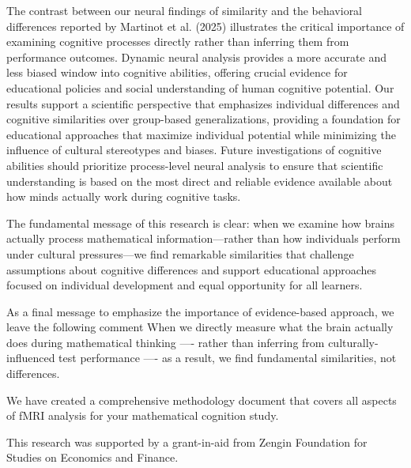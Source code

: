 \documentclass[pdflatex,reference]{sn-jnl}%
\theoremstyle{thmstyleone}%
\theoremstyle{thmstyletwo}%
\theoremstyle{thmstylethree}%
\begin{document}
The contrast between our neural findings of similarity and the behavioral differences reported by Martinot et al. (2025) illustrates the critical importance of examining cognitive processes directly rather than inferring them from performance outcomes. Dynamic neural analysis provides a more accurate and less biased window into cognitive abilities, offering crucial evidence for educational policies and social understanding of human cognitive potential.
Our results support a scientific perspective that emphasizes individual differences and cognitive similarities over group-based generalizations, providing a foundation for educational approaches that maximize individual potential while minimizing the influence of cultural stereotypes and biases. Future investigations of cognitive abilities should prioritize process-level neural analysis to ensure that scientific understanding is based on the most direct and reliable evidence available about how minds actually work during cognitive tasks.

The fundamental message of this research is clear: when we examine how brains actually process mathematical information—rather than how individuals perform under cultural pressures—we find remarkable similarities that challenge assumptions about cognitive differences and support educational approaches focused on individual development and equal opportunity for all learners.

As a final message to emphasize the importance of evidence-based approach, we leave the following comment  When we directly measure what the brain actually does during mathematical thinking ---- rather than inferring from culturally-influenced test performance ---- as a result, we find fundamental similarities, not differences.

\backmatter


We have created a comprehensive methodology document that covers all aspects of fMRI analysis for your mathematical cognition study.


This research was supported by a grant-in-aid from Zengin Foundation for Studies on Economics and Finance.
\end{document}
